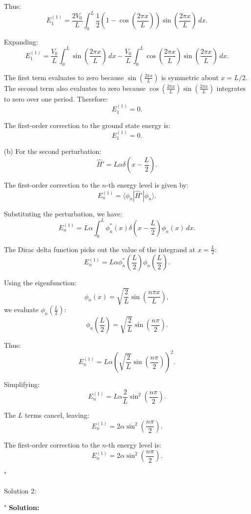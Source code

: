 Thus:
\[
E_1^{(1)} = \frac{2V_0}{L} \int_0^L \frac{1}{2} \left(1 - \cos\left(\frac{2\pi x}{L}\right)\right) \sin\left(\frac{2\pi x}{L}\right) \, dx.
\]

Expanding:
\[
E_1^{(1)} = \frac{V_0}{L} \int_0^L \sin\left(\frac{2\pi x}{L}\right) \, dx - \frac{V_0}{L} \int_0^L \cos\left(\frac{2\pi x}{L}\right) \sin\left(\frac{2\pi x}{L}\right) \, dx.
\]

The first term evaluates to zero because \(\sin\left(\frac{2\pi x}{L}\right)\) is symmetric about \(x = L/2\). The second term also evaluates to zero because \(\cos\left(\frac{2\pi x}{L}\right) \sin\left(\frac{2\pi x}{L}\right)\) integrates to zero over one period. Therefore:
\[
E_1^{(1)} = 0.
\]

The first-order correction to the ground state energy is:
\[
\boxed{E_1^{(1)} = 0.}
\]

(b) For the second perturbation:
\[
\hat{H}' = L \alpha \delta\left(x - \frac{L}{2}\right).
\]

The first-order correction to the \(n\)-th energy level is given by:
\[
E_n^{(1)} = \langle \phi_n | \hat{H}' | \phi_n \rangle.
\]

Substituting the perturbation, we have:
\[
E_n^{(1)} = L \alpha \int_0^L \phi_n^*(x) \delta\left(x - \frac{L}{2}\right) \phi_n(x) \, dx.
\]

The Dirac delta function picks out the value of the integrand at \(x = \frac{L}{2}\):
\[
E_n^{(1)} = L \alpha \phi_n^*\left(\frac{L}{2}\right) \phi_n\left(\frac{L}{2}\right).
\]

Using the eigenfunction:
\[
\phi_n(x) = \sqrt{\frac{2}{L}} \sin\left(\frac{n \pi x}{L}\right),
\]
we evaluate \(\phi_n\left(\frac{L}{2}\right)\):
\[
\phi_n\left(\frac{L}{2}\right) = \sqrt{\frac{2}{L}} \sin\left(\frac{n \pi}{2}\right).
\]

Thus:
\[
E_n^{(1)} = L \alpha \left(\sqrt{\frac{2}{L}} \sin\left(\frac{n \pi}{2}\right)\right)^2.
\]

Simplifying:
\[
E_n^{(1)} = L \alpha \frac{2}{L} \sin^2\left(\frac{n \pi}{2}\right).
\]

The \(L\) terms cancel, leaving:
\[
E_n^{(1)} = 2 \alpha \sin^2\left(\frac{n \pi}{2}\right).
\]

The first-order correction to the \(n\)-th energy level is:
\[
\boxed{E_n^{(1)} = 2 \alpha \sin^2\left(\frac{n \pi}{2}\right).}
\]

"

Solution 2: 

"
\textbf{Solution:}

